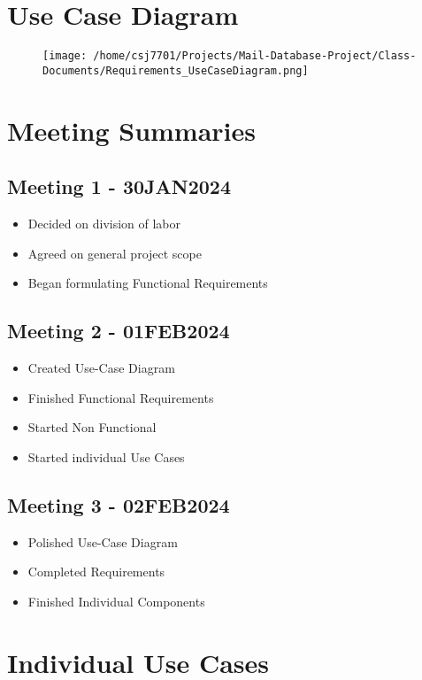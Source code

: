 \documentclass[11pt]{article}
\begin{document}
\section*{Use Case Diagram}
\label{sec:org8e29a86}

\begin{figure}[htbp]
\centering
\texttt{[image: /home/csj7701/Projects/Mail-Database-Project/Class-Documents/Requirements\_UseCaseDiagram.png]}
\end{figure}
\newpage
\section*{Meeting Summaries}
\label{sec:orge84832f}
\subsection*{Meeting 1 - 30JAN2024}
\label{sec:orge9e4e30}
\begin{itemize}
\item Decided on division of labor
\item Agreed on general project scope
\item Began formulating Functional Requirements
\end{itemize}
\subsection*{Meeting 2 - 01FEB2024}
\label{sec:orgccd4ad5}
\begin{itemize}
\item Created Use-Case Diagram
\item Finished Functional Requirements
\item Started Non Functional
\item Started individual Use Cases
\end{itemize}
\subsection*{Meeting 3 - 02FEB2024}
\label{sec:org39d4412}
\begin{itemize}
\item Polished Use-Case Diagram
\item Completed Requirements
\item Finished Individual Components
\end{itemize}

\section*{Individual Use Cases}
\label{sec:orgf4218ee}
\end{document}
